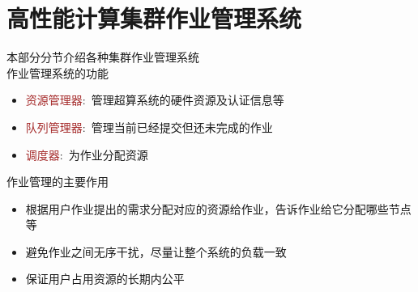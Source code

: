 \documentclass{article}      %
\begin{document}
\section{高性能计算集群作业管理系统}
本部分分节介绍各种集群作业管理系统\\
作业管理系统的功能
\begin{itemize}
	\item \textcolor{brown}{资源管理器}:~管理超算系统的硬件资源及认证信息等
	\item \textcolor{brown}{队列管理器}:~管理当前已经提交但还未完成的作业
	\item \textcolor{brown}{调度器}:~为作业分配资源
\end{itemize}
作业管理的主要作用
\begin{itemize}
	\item 根据用户作业提出的需求分配对应的资源给作业，告诉作业给它分配哪些节点等
	\item 避免作业之间无序干扰，尽量让整个系统的负载一致
	\item 保证用户占用资源的长期内公平
\end{itemize}
\end{document}

